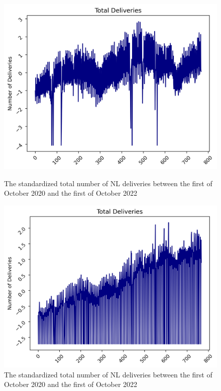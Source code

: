 \begin{figure}
\begin{minipage}{.5\textwidth}
  \centering
  \includegraphics[width=\linewidth]{pics/deliveries_total_NL.png}
  \caption{The standardized total number of NL deliveries between the first of October 2020 and the first of October 2022}
  \label{fig:deliveries_NL}
\end{minipage}
\begin{minipage}{.5\textwidth}
  \centering
  \includegraphics[width=\linewidth]{pics/deliveries_total_DE.png}
  \caption{The standardized total number of NL deliveries between the first of October 2020 and the first of October 2022}
  \label{fig:deliveries_DE}
\end{minipage}


\end{figure}
